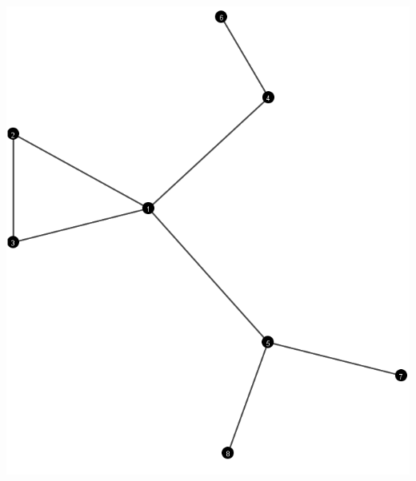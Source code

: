 \documentclass[a4paper]{article}
\begin{document}
\begin{enumerate}
	\includegraphics[width=15cm]{350+.png}
		
\end{enumerate}
\end{document}
